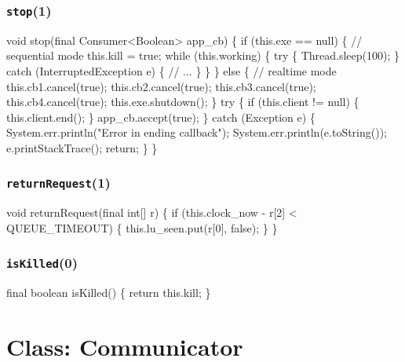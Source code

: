 \subsection{\texttt{stop}(1)}
\nwenddocs{}\endmoddef{}
void stop(final Consumer<Boolean> app_cb) \{
  if (this.exe == null) \{  // sequential mode
    this.kill = true;
    while (this.working) \{
      try \{
        Thread.sleep(100);
      \} catch (InterruptedException e) \{
        // ...
      \}
    \}
  \} else \{  // realtime mode
    this.cb1.cancel(true);
    this.cb2.cancel(true);
    this.cb3.cancel(true);
    this.cb4.cancel(true);
    this.exe.shutdown();
  \}
  try \{
    if (this.client != null) \{
      this.client.end();
    \}
    app_cb.accept(true);
  \} catch (Exception e) \{
    System.err.println("Error in ending callback");
    System.err.println(e.toString());
    e.printStackTrace();
    return;
  \}
\}
\eatline
{}\nwendcode{}\nwdocspar
\subsection{\texttt{returnRequest}(1)}
\nwenddocs{}\endmoddef{}
void returnRequest(final int[] r) \{
  if (this.clock_now - r[2] < QUEUE_TIMEOUT) \{
    this.lu_seen.put(r[0], false);
  \}
\}
\eatline
{}\nwendcode{}\nwdocspar
\subsection{\texttt{isKilled}(0)}
\nwenddocs{}\endmoddef{}
final boolean isKilled() \{
  return this.kill;
\}
\eatline
{}\nwendcode{}\nwdocspar
\nwenddocs{}\chapter{Class: Communicator}
\label{communicator}

